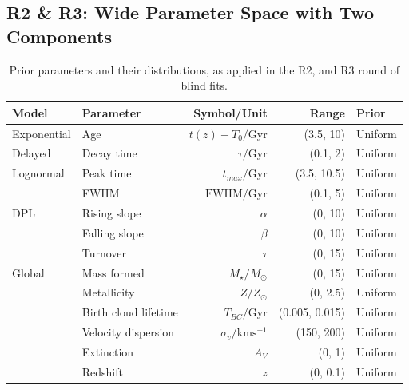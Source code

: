 \documentclass[a4paper,12pt]{article}
\begin{document}
\subsection{R2 \& R3: Wide Parameter Space with Two Components}\label{sec:r2_and_r3}

\begin{table}[h]
  \centering
  \begin{tabular}{l l r r l}
    Model       & Parameter            & Symbol/Unit                  & Range          & Prior    \\
    \hline \hline
    Exponential & Age                  & $t(z)-T_0/\mathrm{Gyr}$      & (3.5, 10)      & Uniform \\
    Delayed     & Decay time           & $\tau/\mathrm{Gyr}$          & (0.1, 2)       & Uniform \\
    \hline
    Lognormal   & Peak time            & $t_{max}/\mathrm{Gyr}$       & (3.5, 10.5)    & Uniform \\
                & FWHM                 & $\mathrm{FWHM/Gyr}$          & (0.1, 5)       & Uniform \\
    \hline
    DPL         & Rising slope         & $\alpha$                     & (0, 10)        & Uniform \\
                & Falling slope        & $\beta$                      & (0, 10)        & Uniform \\
                & Turnover             & $\tau$                       & (0, 15)        & Uniform \\
    \hline
    Global      & Mass formed          & $M_\star/M_\odot$            & (0, 15)        & Uniform \\
                & Metallicity          & $Z/Z_\odot$                  & (0, 2.5)       & Uniform \\
                & Birth cloud lifetime & $T_{BC}/\mathrm{Gyr}$        & (0.005, 0.015) & Uniform \\
                & Velocity dispersion  & $\sigma_v/\mathrm{kms^{-1}}$ & (150, 200)     & Uniform \\
                & Extinction           & $A_V$                        & (0, 1)         & Uniform \\
                & Redshift             & $z$                          & (0, 0.1)       & Uniform \\
    \hline
  \end{tabular}
  \caption{Prior parameters and their distributions, as applied in the R2, and R3 round of blind fits.}
  \label{tab:r2_r3_priors}
\end{table}
\end{document}
